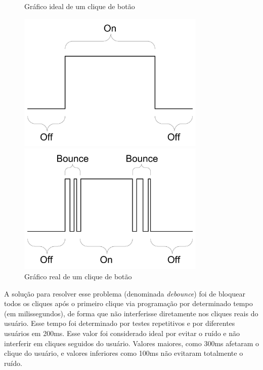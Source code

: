 \documentclass[
		12pt,				%
		openright,			%
		oneside,			%
		a4paper,			%
		chapter=TITLE,		%
		english,			%
		brazil				%
	]{abntex2}
\begin{document}
\begin{figure}[htb]
	\centering
 	\begin{minipage}{0.45\textwidth}
		\centering
		\caption{\label{fig:debounce-graph-1}Gráfico ideal de um clique de botão}
		\includegraphics[width=0.8\textwidth]{img/debounce-graph-1.jpg}
	\end{minipage}
	\hfill
	\begin{minipage}{0.45\textwidth}
		\centering
		\caption{\label{fig:debounce-graph-2}Gráfico real de um clique de botão}
		\includegraphics[width=0.8\textwidth]{img/debounce-graph-2.jpg}
	\end{minipage}
\end{figure}

A solução para resolver esse problema (denominada \textit{debounce}) foi de bloquear todos os cliques após o primeiro clique via programação por determinado tempo (em milissegundos), de forma que não interferisse diretamente nos cliques reais do usuário. Esse tempo foi determinado por testes repetitivos e por diferentes usuários em 200ms. Esse valor foi considerado ideal por evitar o ruído e não interferir em cliques seguidos do usuário. Valores maiores, como 300ms afetaram o clique do usuário, e valores inferiores como 100ms não evitaram totalmente o ruído.
\end{document}
